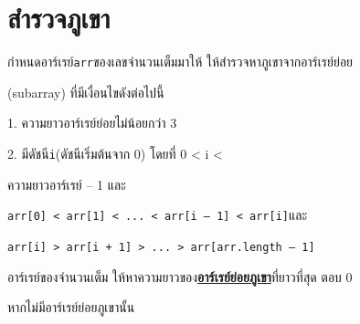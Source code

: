 \documentclass{article}
\begin{document}
\section*{สำรวจภูเขา}

กำหนดอาร์เรย์\texttt{arr}ของเลขจำนวนเต็มมาให้ ให้สำรวจหาภูเขาจากอาร์เรย์ย่อย

(subarray) ที่มีเงื่อนไขดังต่อไปนี้



1. ความยาวอาร์เรย์ย่อยไม่น้อยกว่า 3



2. มีดัชนี\texttt{i}(ดัชนีเริ่มต้นจาก 0) โดยที่ 0 \textless{} i \textless{}

ความยาวอาร์เรย์ -- 1 และ



\texttt{arr{[}0{]}\ \textless{}\ arr{[}1{]}\ \textless{}\ ...\ \textless{}\ arr{[}i\ –\ 1{]}\ \textless{}\ arr{[}i{]}}และ



\texttt{arr{[}i{]}\ \textgreater{}\ arr{[}i\ +\ 1{]}\ \textgreater{}\ ...\ \textgreater{}\ arr{[}arr.length\ –\ 1{]}}



อาร์เรย์ของจำนวนเต็ม ให้หาความยาวของ\ul{\textbf{อาร์เรย์ย่อยภูเขา}}ที่ยาวที่สุด ตอบ 0

หากไม่มีอาร์เรย์ย่อยภูเขานั้น



\hfill\break



\hfill\break
\end{document}

